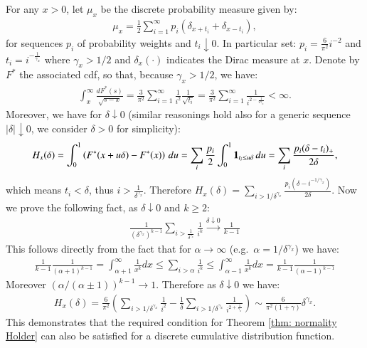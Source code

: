 \begin{example}\label{example: cdf discrete holder}
For any $x >0$, let $\mu_x$ be the discrete probability measure given by:
\begin{align*}
    \mu_x = \frac{1}{2} \sum_{i=1}^{\infty} p_i \left( \delta_{x+t_i} + \delta_{x-t_i}\right) ,
\end{align*}
for sequences $p_i$ of probability weights and $t_i \downarrow 0$. In particular set: $p_i = \frac{6}{\pi^2} i^{-2}$ and $t_i = i^{-\frac{1}{\gamma_x}}$ where $\gamma_x> 1/2$ and $\delta_x(\cdot)$ indicates the Dirac measure at $x$. Denote by $F^*$ the associated cdf, so that, because $\gamma_x> 1/2$, we have:
\begin{align*}
    \int_{x}^{\infty} \frac{dF^*(s)}{\sqrt{s-x}} = \frac{3}{\pi^2} \sum_{i=1}^{\infty} \frac{1}{i^2}\frac{1}{\sqrt{t_i}} = \frac{3}{\pi^2} \sum_{i=1}^{\infty} \frac{1}{i^{2- \frac{1}{2\gamma_x}}} < \infty.
\end{align*}
Moreover, we have for $\delta \downarrow 0$ (similar reasonings hold also for a generic sequence $|\delta| \downarrow 0$, we consider $\delta >0$ for simplicity):
\begin{align*}
    H_x(\delta) = \int_{0}^{1} \left( F^*(x+u\delta) - F^*(x) \right) \, du = \sum_i \frac{p_i}{2} \int_{0}^{1} \mathbf{1}_{t_i \leq u \delta} \, du = \sum_i \frac{p_i (\delta - t_i)_{+}}{2\delta},
\end{align*}
which means $t_i< \delta$, thus $i > \frac{1}{\delta^{\gamma_x}}$. Therefore $H_x(\delta) = \sum_{i > 1/\delta^{\gamma_x}} \frac{p_i(\delta - i^{-1/\gamma_x})}{2\delta}$. Now we prove the following fact, as $\delta \downarrow 0$ and $k \geq 2$:
\begin{align*}
    \frac{1}{(\delta^{\gamma_x})^{k-1}} \sum_{i> \frac{1}{\delta^{\gamma_x}}} \frac{1}{i^k} \stackrel{\delta \downarrow 0}{\longrightarrow} \frac{1}{k-1}
\end{align*}
This follows directly from the fact that for $\alpha \rightarrow \infty$ (e.g.\ $\alpha = 1/\delta^{\gamma_x}$) we have:
\begin{align*}
    \frac{1}{k-1} \frac{1}{(\alpha+1)^{k-1}} = \int_{\alpha + 1}^{\infty} \frac{1}{x^k} dx \leq \sum_{i > \alpha} \frac{1}{i^k} \leq \int_{\alpha-1}^{\infty} \frac{1}{x^k} dx = \frac{1}{k-1} \frac{1}{(\alpha - 1)^{k-1}}
\end{align*}
Moreover $(\alpha/(\alpha \pm 1))^{k-1} \rightarrow 1$. Therefore as $\delta \downarrow 0$ we have:
\begin{align*}
    H_x(\delta) = \frac{6}{\pi^2} \left( \sum_{i > 1/ \delta^{\gamma_x}} \frac{1}{i^2} - \frac{1}{\delta} \sum_{i > 1/ \delta^{\gamma_x}} \frac{1}{i^{2+ \frac{1}{\gamma_x}}}\right) \sim  \frac{6}{\pi^2 (1+\gamma)} \delta^{\gamma_x}.
\end{align*}
This demonstrates that the required condition for Theorem \ref{thm: normality Holder} can also be satisfied for a discrete cumulative distribution function.
\end{example}

